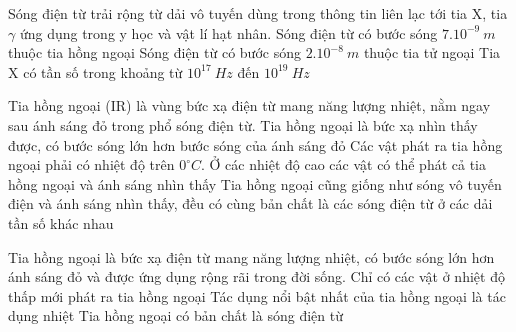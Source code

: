 \setcounter{paragraph}{0}
\setcounter{ex}{0} 
\PhanII
\begin{ex}
Sóng điện từ trải rộng từ dải vô tuyến dùng trong thông tin liên lạc tới tia X, tia $\gamma$ ứng dụng trong y học và vật lí hạt nhân.
{Sóng điện từ có bước sóng $7 . 10^{-9} \ m$ thuộc tia hồng ngoại}
{\True Sóng điện từ có bước sóng $2.10^{-8} \ m$ thuộc tia tử ngoại}
{\True Tia X có tần số trong khoảng từ $10^{17} \ Hz$ đến $10^{19} \ Hz$}
\end{ex} 
\begin{ex}
Tia hồng ngoại (IR) là vùng bức xạ điện từ mang năng lượng nhiệt, nằm ngay sau ánh sáng đỏ trong phổ  sóng điện từ.
{Tia hồng ngoại là bức xạ nhìn thấy được, có bước sóng lớn hơn bước sóng của ánh sáng đỏ}
{Các vật phát ra tia hồng ngoại phải có nhiệt độ trên $0^\circ C$. Ở các nhiệt độ cao các vật có thể phát cả tia hồng ngoại và ánh sáng nhìn thấy}
{\True Tia hồng ngoại cũng giống như sóng vô tuyến điện và ánh sáng nhìn thấy, đều có cùng bản chất là các sóng điện từ ở các dải tần số khác nhau}
\end{ex} 
\begin{ex}
Tia hồng ngoại là bức xạ điện từ mang năng lượng nhiệt, có bước sóng lớn hơn ánh sáng đỏ và được ứng dụng rộng rãi trong đời sống.
{Chỉ có các vật ở nhiệt độ thấp mới phát ra tia hồng ngoại}
{\True Tác dụng nổi bật nhất của tia hồng ngoại là tác dụng nhiệt}
{\True Tia hồng ngoại có bản chất là sóng điện từ}
\end{ex} 

